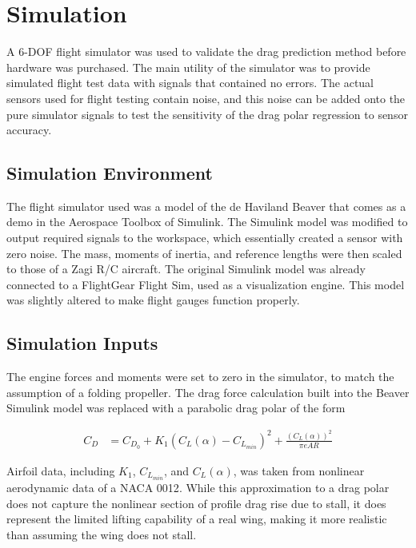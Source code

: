 \section{Simulation}
\label{simulation}
A 6-DOF flight simulator was used to validate the drag prediction method before hardware was purchased. The main utility of the simulator was to provide simulated flight test data with signals that contained no errors. The actual sensors used for flight testing contain noise, and this noise can be added onto the pure simulator signals to test the sensitivity of the drag polar regression to sensor accuracy.

\subsection*{Simulation Environment}
The flight simulator used was a model of the de Haviland Beaver that comes as a demo in the Aerospace Toolbox of Simulink. The Simulink model was modified to output required signals to the workspace, which essentially created a sensor with zero noise. The mass, moments of inertia, and reference lengths were then scaled to those of a Zagi R/C aircraft\cite{stevens2003aircraft}. The original Simulink model was already connected to a FlightGear Flight Sim, used as a visualization engine. This model was slightly altered to make flight gauges function properly.

\subsection*{Simulation Inputs}
The engine forces and moments were set to zero in the simulator, to match the assumption of a folding propeller.
The drag force calculation built into the Beaver Simulink model was replaced with a parabolic drag polar of the form

\begin{align}
C_D &= C_{D_0} + K_1(C_L(\alpha)-C_{L_{min}})^2+\frac{(C_L(\alpha))^2}{\pi eAR}
\end{align}

Airfoil data, including $K_1$, $C_{L_{min}}$, and $C_L(\alpha)$, was taken from nonlinear aerodynamic data of a NACA 0012\cite{osborne2007transitions}. While this approximation to a drag polar does not capture the nonlinear section of profile drag rise due to stall, it does represent the limited lifting capability of a real wing, making it more realistic than assuming the wing does not stall.
